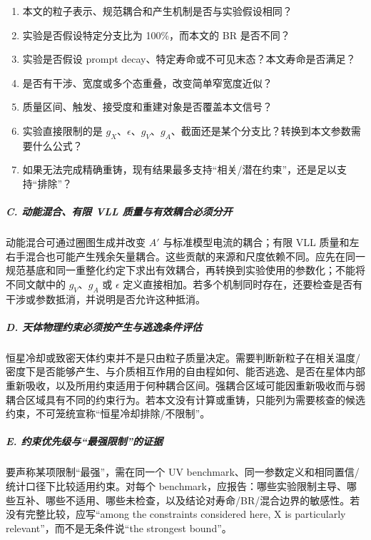 \documentclass[
  chinese,
  UTF8]{ctexart}
\providecommand{\tightlist}{%
  \setlength{\itemsep}{0pt}\setlength{\parskip}{0pt}}
\begin{document}
\begin{enumerate}
\def\labelenumi{\arabic{enumi}.}
\tightlist
\item
  本文的粒子表示、规范耦合和产生机制是否与实验假设相同？
\item
  实验是否假设特定分支比为 100\%，而本文的 BR 是否不同？
\item
  实验是否假设 prompt decay、特定寿命或不可见末态？本文寿命是否满足？
\item
  是否有干涉、宽度或多个态重叠，改变简单窄宽度近似？
\item
  质量区间、触发、接受度和重建对象是否覆盖本文信号？
\item
  实验直接限制的是
  \(g_X\)、\(\epsilon\)、\(g_V\)、\(g_A\)、截面还是某个分支比？转换到本文参数需要什么公式？
\item
  如果无法完成精确重铸，现有结果最多支持``相关/潜在约束''，还是足以支持``排除''？
\end{enumerate}

\subparagraph{C. 动能混合、有限 VLL
质量与有效耦合必须分开}\label{c.-ux52a8ux80fdux6df7ux5408ux6709ux9650-vll-ux8d28ux91cfux4e0eux6709ux6548ux8026ux5408ux5fc5ux987bux5206ux5f00}

动能混合可通过圈图生成并改变 \(A'\) 与标准模型电流的耦合；有限 VLL
质量和左右手混合也可能产生残余矢量耦合。这些贡献的来源和尺度依赖不同。应先在同一规范基底和同一重整化约定下求出有效耦合，再转换到实验使用的参数化；不能将不同文献中的
\(g_V\)、\(g_A\) 或 \(\epsilon\)
定义直接相加。若多个机制同时存在，还要检查是否有干涉或参数抵消，并说明是否允许这种抵消。

\subparagraph{D.
天体物理约束必须按产生与逃逸条件评估}\label{d.-ux5929ux4f53ux7269ux7406ux7ea6ux675fux5fc5ux987bux6309ux4ea7ux751fux4e0eux9003ux9038ux6761ux4ef6ux8bc4ux4f30}

恒星冷却或致密天体约束并不是只由粒子质量决定。需要判断新粒子在相关温度/密度下是否能够产生、与介质相互作用的自由程如何、能否逃逸、是否在星体内部重新吸收，以及所用约束适用于何种耦合区间。强耦合区域可能因重新吸收而与弱耦合区域具有不同的约束行为。若本文没有计算或重铸，只能列为需要核查的候选约束，不可笼统宣称``恒星冷却排除/不限制''。

\subparagraph{E.
约束优先级与``最强限制''的证据}\label{e.-ux7ea6ux675fux4f18ux5148ux7ea7ux4e0eux6700ux5f3aux9650ux5236ux7684ux8bc1ux636e}

要声称某项限制``最强''，需在同一个 UV
benchmark、同一参数定义和相同置信/统计口径下比较适用约束。对每个
benchmark，应报告：哪些实验限制主导、哪些互补、哪些不适用、哪些未检查，以及结论对寿命/BR/混合边界的敏感性。若没有完整比较，应写``among
the constraints considered here, X is particularly
relevant''，而不是无条件说``the strongest bound''。
\end{document}
